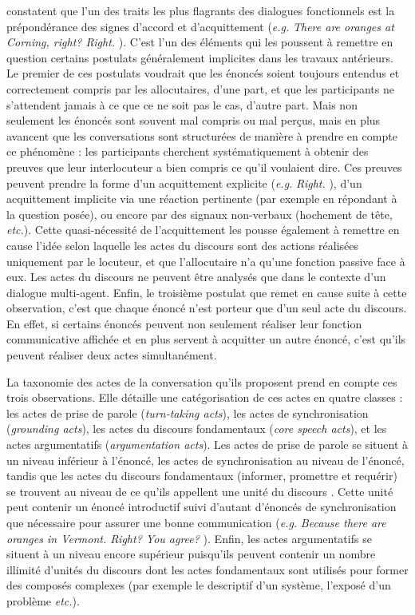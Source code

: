 \documentclass[10pt,a4paper,twoside]{article}
\begin{document}
\citeauthor{traum1992conversation} constatent que l'un des traits les plus flagrants des dialogues fonctionnels est la prépondérance des signes d'accord et d'acquittement (\textit{e.g.} \textit{\og There are oranges at Corning, right? \fg{} \og Right. \fg}). C'est l'un des éléments qui les poussent à remettre en question certains postulats généralement implicites dans les travaux antérieurs. Le premier de ces postulats voudrait que les énoncés soient toujours entendus et correctement compris par les allocutaires, d'une part, et que les participants ne s'attendent jamais à ce que ce ne soit pas le cas, d'autre part. Mais non seulement les énoncés sont souvent mal compris ou mal perçus, mais en plus \citeauthor{traum1992conversation} avancent que les conversations sont structurées de manière à prendre en compte ce phénomène : les participants cherchent systématiquement à obtenir des preuves que leur interlocuteur a bien compris ce qu'il voulaient dire. Ces preuves peuvent prendre la forme d'un acquittement explicite (\textit{e.g.} \textit{\og Right. \fg}), d'un acquittement implicite via une réaction pertinente (par exemple en répondant à la question posée), ou encore par des signaux non-verbaux (hochement de tête, \textit{etc.}). Cette quasi-nécessité de l'acquittement les pousse également à remettre en cause l'idée selon laquelle les actes du discours sont des actions réalisées uniquement par le locuteur, et que l'allocutaire n'a qu'une fonction passive face à eux. Les actes du discours ne peuvent être analysés que dans le contexte d'un dialogue multi-agent. Enfin, le troisième postulat que \citeauthor{traum1992conversation} remet en cause suite à cette observation, c'est que chaque énoncé n'est porteur que d'un seul acte du discours. En effet, si certains énoncés peuvent non seulement réaliser leur fonction communicative affichée et en plus servent à acquitter un autre énoncé, c'est qu'ils peuvent réaliser deux actes simultanément.

La taxonomie des actes de la conversation qu'ils proposent prend en compte ces trois observations. Elle détaille une catégorisation de ces actes en quatre classes : les actes de prise de parole (\textit{turn-taking acts}), les actes de synchronisation (\textit{grounding acts}), les actes du discours fondamentaux (\textit{core speech acts}), et les actes argumentatifs (\textit{argumentation acts}). Les actes de prise de parole se situent à un niveau inférieur à l'énoncé, les actes de synchronisation au niveau de l'énoncé, tandis que les actes du discours fondamentaux (informer, promettre et requérir) se trouvent au niveau de ce qu'ils appellent une \og unité du discours \fg. Cette unité peut contenir un énoncé introductif suivi d'autant d'énoncés de synchronisation que nécessaire pour assurer une bonne communication (\textit{e.g.} \textit{\og Because there are oranges in Vermont. Right? You agree? \fg}). Enfin, les actes argumentatifs se situent à un niveau encore supérieur puisqu'ils peuvent contenir un nombre illimité d'unités du discours dont les actes fondamentaux sont utilisés pour former des composés complexes (par exemple le descriptif d'un système, l'exposé d'un problème \textit{etc.}).
\end{document}
